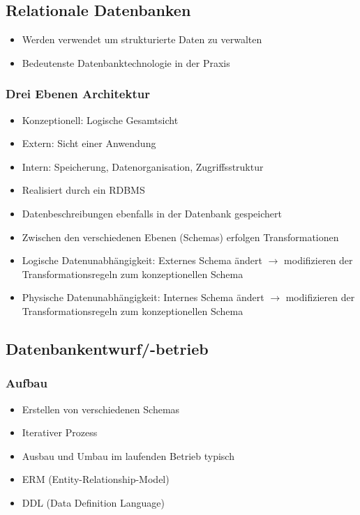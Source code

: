 \documentclass[8pt,a4paper]{scrartcl}
\begin{document}
\begin{multicols*}{3}
			\subsection{Relationale Datenbanken}
				\begin{itemize}\itemsep0pt			
					\item Werden verwendet um strukturierte Daten zu verwalten
					\item Bedeutenste Datenbanktechnologie in der Praxis
				\end{itemize}
				
				\subsubsection{Drei Ebenen Architektur}
					\begin{itemize}\itemsep0pt		
						\item Konzeptionell: Logische Gesamtsicht
						\item Extern: Sicht einer Anwendung
						\item Intern: Speicherung, Datenorganisation, Zugriffsstruktur
						\item Realisiert durch ein RDBMS
						\item Datenbeschreibungen ebenfalls in der Datenbank gespeichert
						\item Zwischen den verschiedenen Ebenen (Schemas) erfolgen Transformationen
						\item Logische Datenunabhängigkeit: Externes Schema ändert $\rightarrow$ modifizieren der Transformationsregeln zum konzeptionellen Schema
						\item Physische Datenunabhängigkeit: Internes Schema ändert $\rightarrow$ modifizieren der Transformationsregeln zum konzeptionellen Schema
					\end{itemize}
					
				\subsection{Datenbankentwurf/-betrieb}
					\subsubsection{Aufbau}
						\begin{itemize}\itemsep0pt			
							\item Erstellen von verschiedenen Schemas
							\item Iterativer Prozess
							\item Ausbau und Umbau im laufenden Betrieb typisch
							\item ERM (Entity-Relationship-Model)
							\item DDL (Data Definition Language)
						\end{itemize}
						

\end{multicols*}
\end{document}
